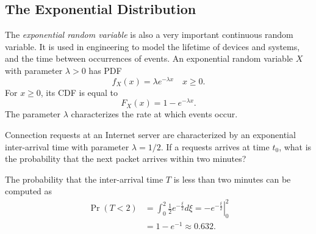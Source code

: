 \subsection{The Exponential Distribution}

The \emph{exponential random variable} is also a very important continuous random variable. 
It is used in engineering to model the lifetime of devices and systems, and the time between occurrences of events.
An exponential random variable $X$ with parameter $\lambda > 0$ has PDF
\begin{equation*}
f_X (x) = \lambda e^{- \lambda x} \quad x \geq 0.
\end{equation*}
For $x \geq 0$, its CDF is equal to
\begin{equation*}
F_X (x) = 1 - e^{- \lambda x} .
\end{equation*}
The parameter $\lambda$ characterizes the rate at  which events occur.

\begin{example}
Connection requests at an Internet server are characterized by an exponential inter-arrival time with parameter $\lambda = 1/2$.
If a requests arrives at time $t_0$, what is the probability that the next packet arrives within two minutes?

The probability that the inter-arrival time $T$ is less than two minutes can be computed as
\begin{equation*}
\begin{split}
\Pr ( T < 2 ) &= \int_0^2 \frac{1}{2} e^{- \frac{\xi}{2}} d\xi
= \left. - e^{- \frac{\xi}{2}} \right|_0^2 \\
&= 1 - e^{-1} \approx 0.632 .
\end{split}
\end{equation*}
\end{example}

